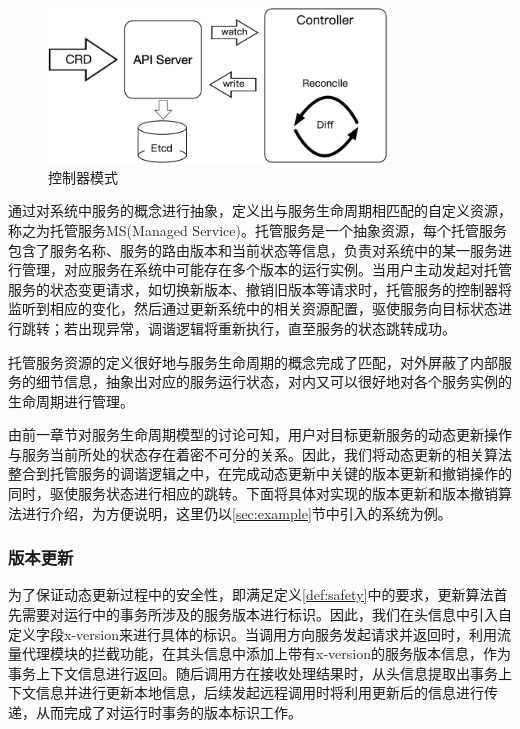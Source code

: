 \documentclass[macfonts,master]{njuthesis}
\begin{document}
\begin{figure}[!htbp]
  \centering
  \includegraphics[width= 0.8\textwidth]{image/reconcile_loop.png}
  \caption{控制器模式}
  \label{fig:reconcile_loop}
\end{figure}

通过对系统中服务的概念进行抽象，定义出与服务生命周期相匹配的自定义资源，称之为托管服务MS(Managed Service)。托管服务是一个抽象资源，每个托管服务包含了服务名称、服务的路由版本和当前状态等信息，负责对系统中的某一服务进行管理，对应服务在系统中可能存在多个版本的运行实例。当用户主动发起对托管服务的状态变更请求，如切换新版本、撤销旧版本等请求时，托管服务的控制器将监听到相应的变化，然后通过更新系统中的相关资源配置，驱使服务向目标状态进行跳转；若出现异常，调谐逻辑将重新执行，直至服务的状态跳转成功。

托管服务资源的定义很好地与服务生命周期的概念完成了匹配，对外屏蔽了内部服务的细节信息，抽象出对应的服务运行状态，对内又可以很好地对各个服务实例的生命周期进行管理。

由前一章节对服务生命周期模型的讨论可知，用户对目标更新服务的动态更新操作与服务当前所处的状态存在着密不可分的关系。因此，我们将动态更新的相关算法整合到托管服务的调谐逻辑之中，在完成动态更新中关键的版本更新和撤销操作的同时，驱使服务状态进行相应的跳转。下面将具体对实现的版本更新和版本撤销算法进行介绍，为方便说明，这里仍以\ref{sec:example}节中引入的系统为例。

\subsubsection{版本更新}
为了保证动态更新过程中的安全性，即满足定义\ref{def:safety}中的要求，更新算法首先需要对运行中的事务所涉及的服务版本进行标识。因此，我们在头信息中引入自定义字段x-version来进行具体的标识。当调用方向服务发起请求并返回时，利用流量代理模块的拦截功能，在其头信息中添加上带有x-version的服务版本信息，作为事务上下文信息进行返回。随后调用方在接收处理结果时，从头信息提取出事务上下文信息并进行更新本地信息，后续发起远程调用时将利用更新后的信息进行传递，从而完成了对运行时事务的版本标识工作。
\end{document}
